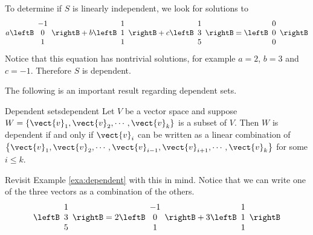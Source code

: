 \begin{solution}
To determine if $S$ is linearly independent, we look for solutions to
\[ 
a\leftB\begin{array}{c} -1 \\ 0 \\ 1 \end{array}\rightB
+b\leftB\begin{array}{c} 1 \\ 1 \\ 1 \end{array}\rightB
+c\leftB\begin{array}{c} 1 \\ 3 \\ 5 \end{array}\rightB
=\leftB\begin{array}{c} 0 \\ 0 \\ 0 \end{array}\rightB
\]
Notice that this equation has nontrivial solutions, 
for example $a=2$, $b=3$ and $c=-1$. Therefore $S$ is dependent. 
\end{solution}

The following is an important result regarding dependent sets.

\begin{lemma}{Dependent sets}{dependent}
Let $V$ be a vector space and suppose $W = \left\{ \vect{v}_1, \vect{v}_2, \cdots, \vect{v}_k \right\}$ is a subset of $V$. Then $W$ is dependent if and only if $\vect{v}_i$ can be written as a linear combination of $\left\{ \vect{v}_1, \vect{v}_2, \cdots, \vect{v}_{i-1}, \vect{v}_{i+1}, \cdots,  \vect{v}_k \right\}$ for some $i \leq k$. 
\end{lemma}

Revisit Example \ref{exa:dependent} with this in mind. Notice that we can write one of the three vectors as a combination of the others.
\[
\leftB\begin{array}{c} 1 \\ 3 \\ 5 \end{array}\rightB
=
2\leftB\begin{array}{c} -1 \\ 0 \\ 1 \end{array}\rightB
+3\leftB\begin{array}{c} 1 \\ 1 \\ 1 \end{array}\rightB
\]

